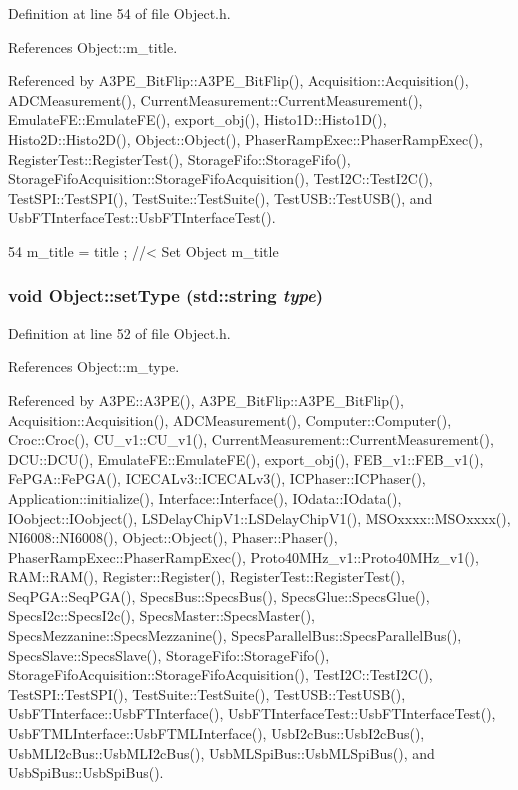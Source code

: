 Definition at line 54 of file Object.h.

References Object::m\_\-title.

Referenced by A3PE\_\-BitFlip::A3PE\_\-BitFlip(), Acquisition::Acquisition(), ADCMeasurement(), CurrentMeasurement::CurrentMeasurement(), EmulateFE::EmulateFE(), export\_\-obj(), Histo1D::Histo1D(), Histo2D::Histo2D(), Object::Object(), PhaserRampExec::PhaserRampExec(), RegisterTest::RegisterTest(), StorageFifo::StorageFifo(), StorageFifoAcquisition::StorageFifoAcquisition(), TestI2C::TestI2C(), TestSPI::TestSPI(), TestSuite::TestSuite(), TestUSB::TestUSB(), and UsbFTInterfaceTest::UsbFTInterfaceTest().


\begin{DoxyCode}
54 { m_title = title ; } //< Set Object m_title
\end{DoxyCode}
\hypertarget{classObject_aae534cc9d982bcb9b99fd505f2e103a5}{
\subsubsection[{setType}]{\setlength{\rightskip}{0pt plus 5cm}void Object::setType (std::string {\em type})}}
\label{classObject_aae534cc9d982bcb9b99fd505f2e103a5}


Definition at line 52 of file Object.h.

References Object::m\_\-type.

Referenced by A3PE::A3PE(), A3PE\_\-BitFlip::A3PE\_\-BitFlip(), Acquisition::Acquisition(), ADCMeasurement(), Computer::Computer(), Croc::Croc(), CU\_\-v1::CU\_\-v1(), CurrentMeasurement::CurrentMeasurement(), DCU::DCU(), EmulateFE::EmulateFE(), export\_\-obj(), FEB\_\-v1::FEB\_\-v1(), FePGA::FePGA(), ICECALv3::ICECALv3(), ICPhaser::ICPhaser(), Application::initialize(), Interface::Interface(), IOdata::IOdata(), IOobject::IOobject(), LSDelayChipV1::LSDelayChipV1(), MSOxxxx::MSOxxxx(), NI6008::NI6008(), Object::Object(), Phaser::Phaser(), PhaserRampExec::PhaserRampExec(), Proto40MHz\_\-v1::Proto40MHz\_\-v1(), RAM::RAM(), Register::Register(), RegisterTest::RegisterTest(), SeqPGA::SeqPGA(), SpecsBus::SpecsBus(), SpecsGlue::SpecsGlue(), SpecsI2c::SpecsI2c(), SpecsMaster::SpecsMaster(), SpecsMezzanine::SpecsMezzanine(), SpecsParallelBus::SpecsParallelBus(), SpecsSlave::SpecsSlave(), StorageFifo::StorageFifo(), StorageFifoAcquisition::StorageFifoAcquisition(), TestI2C::TestI2C(), TestSPI::TestSPI(), TestSuite::TestSuite(), TestUSB::TestUSB(), UsbFTInterface::UsbFTInterface(), UsbFTInterfaceTest::UsbFTInterfaceTest(), UsbFTMLInterface::UsbFTMLInterface(), UsbI2cBus::UsbI2cBus(), UsbMLI2cBus::UsbMLI2cBus(), UsbMLSpiBus::UsbMLSpiBus(), and UsbSpiBus::UsbSpiBus().


